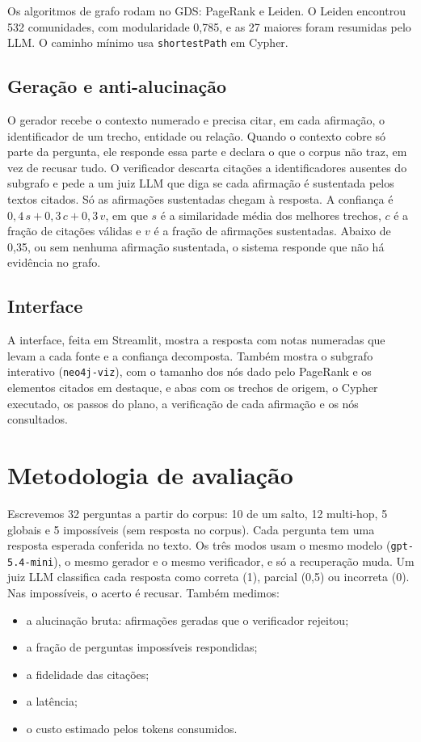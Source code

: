 \documentclass[12pt]{article}
\begin{document}
Os algoritmos de grafo rodam no GDS: PageRank e Leiden. O Leiden encontrou 532 comunidades, com modularidade
0,785, e as 27 maiores foram resumidas pelo LLM. O caminho mínimo usa \texttt{shortestPath} em Cypher.

\subsection{Geração e anti-alucinação}

O gerador recebe o contexto numerado e precisa citar, em cada afirmação, o identificador de um trecho, entidade
ou relação. Quando o contexto cobre só parte da pergunta, ele responde essa parte e declara o que o corpus não
traz, em vez de recusar tudo. O verificador descarta citações a identificadores ausentes do subgrafo e pede a um juiz LLM que diga
se cada afirmação é sustentada pelos textos citados. Só as afirmações sustentadas chegam à resposta. A
confiança é $0{,}4\,s + 0{,}3\,c + 0{,}3\,v$, em que $s$ é a similaridade média dos melhores trechos, $c$ é a
fração de citações válidas e $v$ é a fração de afirmações sustentadas. Abaixo de 0,35, ou sem nenhuma afirmação
sustentada, o sistema responde que não há evidência no grafo.

\subsection{Interface}

A interface, feita em Streamlit, mostra a resposta com notas numeradas que levam a cada fonte e a confiança
decomposta. Também mostra o subgrafo interativo (\texttt{neo4j-viz}), com o tamanho dos nós dado pelo PageRank e
os elementos citados em destaque, e abas com os trechos de origem, o Cypher executado, os passos do plano, a
verificação de cada afirmação e os nós consultados.

\section{Metodologia de avaliação}

Escrevemos 32 perguntas a partir do corpus: 10 de um salto, 12 multi-hop, 5 globais e 5 impossíveis (sem
resposta no corpus). Cada pergunta tem uma resposta esperada conferida no texto. Os três modos usam o mesmo
modelo (\texttt{gpt-5.4-mini}), o mesmo gerador e o mesmo verificador, e só a recuperação muda. Um juiz LLM
classifica cada resposta como correta (1), parcial (0,5) ou incorreta (0). Nas impossíveis, o acerto é recusar.
Também medimos:
\begin{itemize}
  \item a alucinação bruta: afirmações geradas que o verificador rejeitou;
  \item a fração de perguntas impossíveis respondidas;
  \item a fidelidade das citações;
  \item a latência;
  \item o custo estimado pelos tokens consumidos.
\end{itemize}
\end{document}
